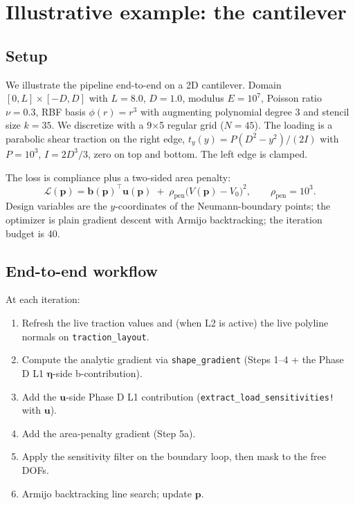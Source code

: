 \documentclass[11pt,a4paper]{article}
\newcommand{\vect}[1]{\boldsymbol{#1}}
\newcommand{\pts}{\vect{p}}
\newcommand{\Loss}{\mathcal{L}}
\begin{document}
\section{Illustrative example: the cantilever}
\label{sec:cantilever}

\subsection{Setup}

We illustrate the pipeline end-to-end on a 2D cantilever. Domain
$[0, L] \times [-D, D]$ with $L = 8.0$, $D = 1.0$, modulus
$E = 10^7$, Poisson ratio $\nu = 0.3$, RBF basis $\phi(r) = r^3$
with augmenting polynomial degree 3 and stencil size $k = 35$.
We discretize with a 9$\times$5 regular grid ($N = 45$). The
loading is a parabolic shear traction on the right edge,
$t_y(y) = P(D^2 - y^2)/(2I)$ with $P = 10^3$, $I = 2D^3/3$, zero
on top and bottom. The left edge is clamped.

The loss is compliance plus a two-sided area penalty:
\begin{equation}
  \Loss(\pts) = \vect b(\pts)^\top \vect u(\pts)
    \;+\; \rho_{\text{pen}}\big(V(\pts) - V_0\big)^2,
  \qquad \rho_{\text{pen}} = 10^3.
\end{equation}
Design variables are the $y$-coordinates of the Neumann-boundary
points; the optimizer is plain gradient descent with Armijo
backtracking; the iteration budget is 40.

\subsection{End-to-end workflow}

At each iteration:
\begin{enumerate}
  \item Refresh the live traction values and (when L2 is active)
        the live polyline normals on \texttt{traction\_layout}.
  \item Compute the analytic gradient via \texttt{shape\_gradient}
        (Steps 1--4 + the Phase D L1 $\vect\eta$-side b-contribution).
  \item Add the $\vect u$-side Phase D L1 contribution
        (\texttt{extract\_load\_sensitivities!} with $\vect u$).
  \item Add the area-penalty gradient (Step 5a).
  \item Apply the sensitivity filter on the boundary loop, then
        mask to the free DOFs.
  \item Armijo backtracking line search; update $\pts$.
\end{enumerate}
\end{document}
